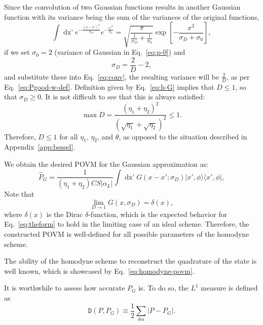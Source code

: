 Since the convolution of two Gaussian functions results in another Gaussian function with its variance being the sum of the variances of the original functions,
\begin{equation}
    \int\mathop{dx'}e^{-\frac{(x-x')^2}{\sigma_D}}e^{-\frac{x{'}^{2}}{\sigma_0}}=\sqrt{\frac{\pi}{\frac{1}{\sigma_D}+\frac{1}{\sigma_0}}}\exp\left[-\frac{x^2}{\sigma_D+\sigma_0}\right],
    \label{eq:conv}
\end{equation}
if we set $\sigma_0=2$ (variance of Gaussian in Eq.~\eqref{eq:p-0}) and
\begin{equation}
     \sigma_D=\frac{2}{D}-2,\label{eq:h-G}
\end{equation}
and substitute these into Eq.~\eqref{eq:conv}, the resulting variance will be $\frac{2}{D}$, as per Eq.~\eqref{eq:Pgood-w-def}. 
{Definition given by Eq.{~\eqref{eq:h-G}} implies that $D\leq1$, so that $\sigma_D\geq0$. It is not difficult to see that this is always satisfied:}
\begin{equation}
    {\max D=\frac{\left(\eta_1+\eta_2\right)^2}{\left(\sqrt{\eta_1}+\sqrt{\eta_2}\right)^2}\leq1.}
\end{equation}
 Therefore, $D\leq1$ for all $\eta_1$, $\eta_2$, and $\theta$, as opposed to the situation described in Appendix{~\ref{app:bessel}}.

We obtain the desired POVM for the Gaussian approximation as:
\begin{equation}
\hat{{P}}_G=\frac{1}{(\eta_1+\eta_2)CS|\alpha_L|}\int \mathop{dx'} G(x-x'; \sigma_D)|x',\phi\rangle\langle x',\phi|,
\label{eq:homodyne-povm}
\end{equation}
Note that 
\begin{equation}
    \lim_{D\to1}G(x,\sigma_D)=\delta(x),
\end{equation}
where $\delta(x)$ is the Dirac $\delta$-function, which is the expected behavior for Eq.~\eqref{eq:theform} to hold in the limiting case of an ideal scheme. Therefore, the constructed POVM is well-defined for all possible parameters of the homodyne scheme.

The ability of the homodyne scheme to reconstruct the quadrature of the state is well known, which is showcased by Eq.~\eqref{eq:homodyne-povm}.

It is worthwhile to assess how accurate $P_G$ is. To do so, the $L^1$ measure is defined as
\begin{equation}
    \mathtt{D}\left(P,{P}_{G}\right)\equiv
    \frac{1}{2}{\sum_{\delta m}
    \left|P -{P}_G\right|}.
\end{equation}

